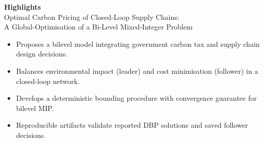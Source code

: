 \documentclass[12pt, a4paper]{article}
\begin{document}
\begin{center}
  {\large\bfseries Highlights}\\[0.5em]
  {\normalsize Optimal Carbon Pricing of Closed-Loop Supply Chains:\\[0.15em]
   A Global-Optimisation of a Bi-Level Mixed-Integer Problem}
\end{center}

\bigskip

\begin{itemize}
  \setlength{\itemsep}{6pt}
  \item Proposes a bilevel model integrating government carbon tax and
        supply chain design decisions.
  \item Balances environmental impact (leader) and cost minimisation
        (follower) in a closed-loop network.
  \item Develops a deterministic bounding procedure with convergence
        guarantee for bilevel MIP.
  \item Reproducible artifacts validate reported DBP solutions and
        saved follower decisions.
\end{itemize}
\end{document}
